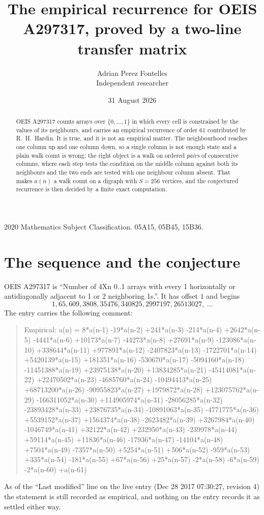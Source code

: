 \documentclass[11pt,a4paper]{article}
\title{The empirical recurrence for OEIS A297317, proved by a two-line transfer matrix}
\author{Adrian Perez Fontelles\\ \small Independent researcher}
\date{31 August 2026}
\theoremstyle{plain}
\theoremstyle{definition}
\begin{document}
\maketitle

\begin{abstract}
OEIS A297317 counts arrays over $\{0,\dots,1\}$ in which every cell is constrained by the
values of its neighbours, and carries an empirical recurrence of order $61$ contributed
by R.~H.~Hardin. It is true, and it is not an empirical matter. The neighbourhood reaches one
column up and one column down, so a single column is not enough state and a plain walk count
is wrong; the right object is a walk on ordered \emph{pairs} of consecutive columns, where
each step tests the condition on the middle column against both its neighbours and the two
ends are tested with one neighbour column absent. That makes $a(n)$ a walk count on a digraph
with $S=256$ vertices, and the conjectured recurrence is then decided by a finite exact
computation.
\end{abstract}

\noindent\small 2020 Mathematics Subject Classification. 05A15, 05B45, 15B36.\normalsize

\section{The sequence and the conjecture}

OEIS A297317 is ``Number of 4Xn 0..1 arrays with every 1 horizontally or antidiagonally adjacent to 1 or 2 neighboring 1s.''. It has offset $1$ and begins
\[
1, 65, 609, 3808, 35476, 340825, 2997197, 26513027,\ \dots
\]
The entry carries the following comment:
\begin{quote}\small
Empirical: a(n) = 8*a(n-1) -19*a(n-2) +241*a(n-3) -214*a(n-4) +2642*a(n-5) -4441*a(n-6) +10173*a(n-7) -44273*a(n-8) +27691*a(n-9) -123086*a(n-10) +338644*a(n-11) +977891*a(n-12) -2407823*a(n-13) -1722701*a(n-14) +5420139*a(n-15) +181351*a(n-16) -530670*a(n-17) -5094160*a(n-18) -11451388*a(n-19) +23975138*a(n-20) +13834285*a(n-21) -45414081*a(n-22) +22470502*a(n-23) -4685760*a(n-24) -10494413*a(n-25) +68713200*a(n-26) -90955823*a(n-27) +1979872*a(n-28) +123075762*a(n-29) -166311052*a(n-30) +114905974*a(n-31) -28056285*a(n-32) -23893428*a(n-33) +23876735*a(n-34) -10891063*a(n-35) -4771775*a(n-36) +5539152*a(n-37) +1564374*a(n-38) -2623482*a(n-39) +3267984*a(n-40) -1046749*a(n-41) +32122*a(n-42) +232950*a(n-43) -239978*a(n-44) +59114*a(n-45) +11836*a(n-46) -17936*a(n-47) -14104*a(n-48) +7504*a(n-49) -7357*a(n-50) +5254*a(n-51) +506*a(n-52) -959*a(n-53) +335*a(n-54) -181*a(n-55) +67*a(n-56) +25*a(n-57) -2*a(n-58) -6*a(n-59) -2*a(n-60) +a(n-61)
\end{quote}
As of the ``Last modified'' line on the live entry (Dec 28 2017 07:30:27, revision 4) the statement is
still recorded as empirical, and nothing on the entry records it as settled either way.
\end{document}
